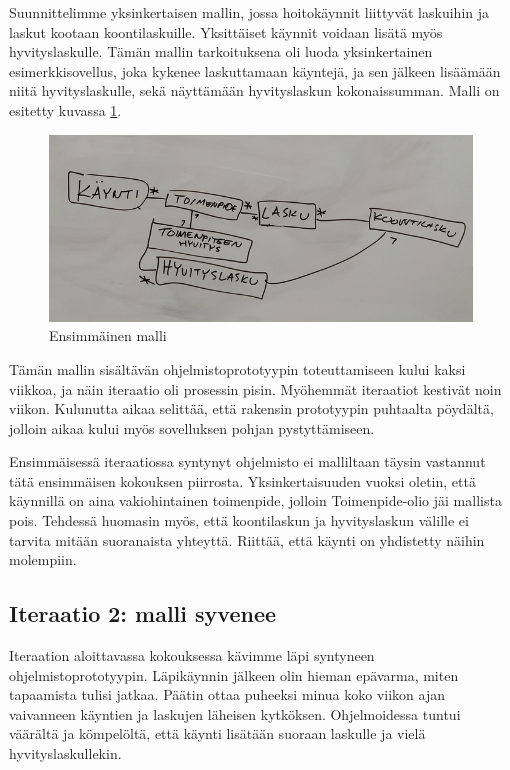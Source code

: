 Suunnittelimme yksinkertaisen mallin, jossa hoitokäynnit liittyvät
laskuihin ja laskut kootaan koontilaskuille. Yksittäiset käynnit voidaan
lisätä myös hyvityslaskulle. Tämän mallin tarkoituksena oli luoda
yksinkertainen esimerkkisovellus, joka kykenee laskuttamaan käyntejä, ja
sen jälkeen lisäämään niitä hyvityslaskulle, sekä näyttämään
hyvityslaskun kokonaissumman. Malli on esitetty kuvassa \ref{malli1}.

\begin{figure}
\centering
\includegraphics{illustration/malli1.jpg}
\caption{\label{malli1} Ensimmäinen malli}
\end{figure}

Tämän mallin sisältävän ohjelmistoprototyypin toteuttamiseen kului kaksi
viikkoa, ja näin iteraatio oli prosessin pisin. Myöhemmät iteraatiot
kestivät noin viikon. Kulunutta aikaa selittää, että rakensin
prototyypin puhtaalta pöydältä, jolloin aikaa kului myös sovelluksen
pohjan pystyttämiseen.

Ensimmäisessä iteraatiossa syntynyt ohjelmisto ei malliltaan täysin
vastannut tätä ensimmäisen kokouksen piirrosta. Yksinkertaisuuden vuoksi
oletin, että käynnillä on aina vakiohintainen toimenpide, jolloin
Toimenpide-olio jäi mallista pois. Tehdessä huomasin myös, että
koontilaskun ja hyvityslaskun välille ei tarvita mitään suoranaista
yhteyttä. Riittää, että käynti on yhdistetty näihin molempiin.

\hypertarget{iteraatio-2-malli-syvenee}{%
\subsection{Iteraatio 2: malli
syvenee}\label{iteraatio-2-malli-syvenee}}

Iteraation aloittavassa kokouksessa kävimme läpi syntyneen
ohjelmistoprototyypin. Läpikäynnin jälkeen olin hieman epävarma, miten
tapaamista tulisi jatkaa. Päätin ottaa puheeksi minua koko viikon ajan
vaivanneen käyntien ja laskujen läheisen kytköksen. Ohjelmoidessa tuntui
väärältä ja kömpelöltä, että käynti lisätään suoraan laskulle ja vielä
hyvityslaskullekin.

